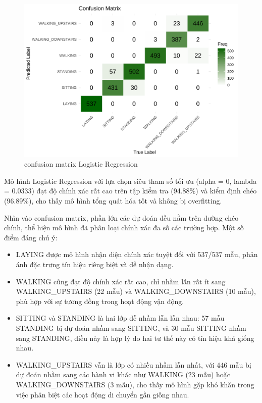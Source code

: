 \documentclass[
]{article}
\begin{document}
\begin{figure}
\centering
\includegraphics{report_files/figure-latex/unnamed-chunk-23-1.pdf}
\caption{confusion matrix Logistic Regression}
\end{figure}

Mô hình Logistic Regression với lựa chọn siêu tham số tối ưu (alpha = 0,
lambda = 0.0333) đạt độ chính xác rất cao trên tập kiểm tra (94.88\%) và
kiểm định chéo (96.89\%), cho thấy mô hình tổng quát hóa tốt và không bị
overfitting.

Nhìn vào confusion matrix, phần lớn các dự đoán đều nằm trên đường chéo
chính, thể hiện mô hình đã phân loại chính xác đa số các trường hợp. Một
số điểm đáng chú ý:

\begin{itemize}
\item
  LAYING được mô hình nhận diện chính xác tuyệt đối với 537/537 mẫu,
  phản ánh đặc trưng tín hiệu riêng biệt và dễ nhận dạng.
\item
  WALKING cũng đạt độ chính xác rất cao, chỉ nhầm lẫn rất ít sang
  WALKING\_UPSTAIRS (22 mẫu) và WALKING\_DOWNSTAIRS (10 mẫu), phù hợp
  với sự tương đồng trong hoạt động vận động.
\item
  SITTING và STANDING là hai lớp dễ nhầm lẫn lẫn nhau: 57 mẫu STANDING
  bị dự đoán nhầm sang SITTING, và 30 mẫu SITTING nhầm sang STANDING,
  điều này là hợp lý do hai tư thế này có tín hiệu khá giống nhau.
\item
  WALKING\_UPSTAIRS vẫn là lớp có nhiều nhầm lẫn nhất, với 446 mẫu bị dự
  đoán nhầm sang các hành vi khác như WALKING (23 mẫu) hoặc
  WALKING\_DOWNSTAIRS (3 mẫu), cho thấy mô hình gặp khó khăn trong việc
  phân biệt các hoạt động di chuyển gần giống nhau.
\end{itemize}
\end{document}
